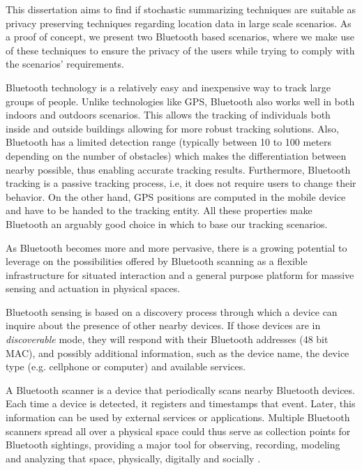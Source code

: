 This dissertation aims to find if stochastic summarizing techniques
are suitable as privacy preserving techniques regarding location
data in large scale scenarios. As a proof of concept, we present two
Bluetooth based scenarios, where we make use of these techniques
to ensure the privacy of the users while trying to comply with the
scenarios' requirements.

Bluetooth technology is a relatively easy and inexpensive way to track
large groups of people. Unlike technologies like GPS, Bluetooth also
works well in both indoors and outdoors scenarios. This allows the
tracking of individuals both inside and outside buildings allowing for
more robust tracking solutions.  Also, Bluetooth has a limited
detection range (typically between 10 to 100 meters depending on the
number of obstacles) which makes the differentiation between nearby
possible, thus enabling accurate tracking results. Furthermore,
Bluetooth tracking is a passive tracking process, i.e, it does not
require users to change their behavior. On the other hand, GPS
positions are computed in the mobile device and have to be handed to
the tracking entity.  All these properties make Bluetooth an arguably
good choice in which to base our tracking scenarios.

As Bluetooth becomes more and more pervasive, there is a growing
potential to leverage on the possibilities offered by Bluetooth
scanning as a flexible infrastructure for situated interaction and a
general purpose platform for massive sensing and actuation in physical
spaces.

Bluetooth sensing is based on a discovery process through
which a device can inquire about the presence of other nearby devices.
If those devices are in \emph{discoverable} mode, they will respond
with their Bluetooth addresses (48 bit MAC), and possibly additional
information, such as the device name, the device type (e.g. cellphone
or computer) and available services.

A Bluetooth scanner is a device that periodically scans nearby
Bluetooth devices. Each time a device is detected, it registers and
timestamps that event. Later, this information can be used by external
services or applications. Multiple Bluetooth scanners spread all over
a physical space could thus serve as collection points for Bluetooth
sightings, providing a major tool for observing, recording, modeling
and analyzing that space, physically, digitally and socially
\cite{Oneill:2006vq}.


